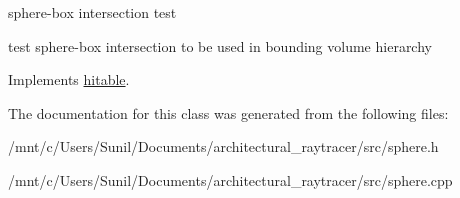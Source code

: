 sphere-\/box intersection test 

test sphere-\/box intersection to be used in bounding volume hierarchy 

Implements \hyperlink{classhitable}{hitable}.



The documentation for this class was generated from the following files\+:\begin{DoxyCompactItemize}
\item 
/mnt/c/\+Users/\+Sunil/\+Documents/architectural\+\_\+raytracer/src/sphere.\+h\item 
/mnt/c/\+Users/\+Sunil/\+Documents/architectural\+\_\+raytracer/src/sphere.\+cpp\end{DoxyCompactItemize}
